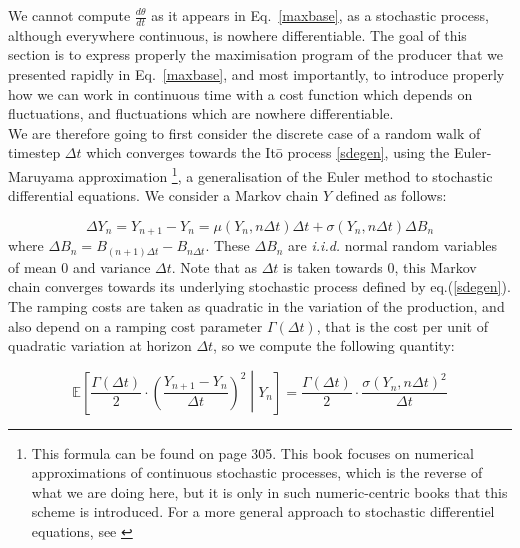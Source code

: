 We cannot compute $\frac{d\theta}{dt}$ as it appears in Eq.~\ref{maxbase}, as a stochastic process, although everywhere continuous, is nowhere differentiable. The goal of this section is to express properly the maximisation program of the producer that we presented rapidly in Eq.~\ref{maxbase}, and most importantly, to introduce properly how we can work in continuous time with a cost function which depends on fluctuations, and fluctuations which are nowhere differentiable.\\

We are therefore going to first consider the discrete case of a random walk of timestep $\Delta t$ which converges towards the It\={o} process \ref{sdegen}, using the Euler-Maruyama approximation \cite{kloeden2011numerical}\footnote{This formula can be found on page 305. This book focuses on numerical approximations of continuous stochastic processes, which is the reverse of what we are doing here, but it is only in such numeric-centric books that this scheme is introduced. For a more general approach to stochastic differentiel equations, see \cite{oksendal2003stochastic}}, a generalisation of the Euler method to stochastic differential equations. We consider a Markov chain $Y$ defined as follows: 

\begin{equation}
\Delta Y_n=Y_{n+1}-Y_n= \mu(Y_n,n \Delta t)\Delta t+\sigma (Y_n,n \Delta t)\Delta B_n
\end{equation}
where $\Delta B_n=B_{(n+1)\Delta t}-B_{n\Delta t}$. These $\Delta B_n$ are \emph{i.i.d.} normal random variables of mean $0$ and variance $\Delta t$. Note that as $\Delta t$ is taken towards $0$, this Markov chain converges towards its underlying stochastic process defined by eq.(\ref{sdegen}).\\

The ramping costs are taken as quadratic in the variation of the production, and also depend on a ramping cost parameter $\Gamma(\Delta t)$, that is the cost per unit of quadratic variation at horizon $\Delta t$, so we compute the following quantity: 

\begin{equation}
\mathbb{E}\left[\frac{\Gamma(\Delta t)}{2}\cdot\left(\frac{Y_{n+1}-Y_n}{\Delta t}\right)^2\middle \vert Y_n  \right]=\frac{\Gamma(\Delta t)}{2}\cdot\frac{\sigma (Y_n,n \Delta t)^2}{\Delta t}
\label{markovariation}
\end{equation}

